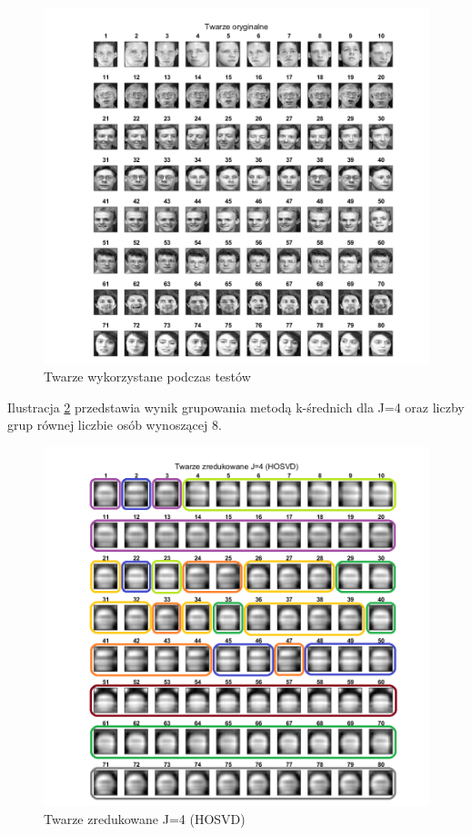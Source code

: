 \documentclass[11pt, a4paper]{article}
\begin{document}
\begin{figure}[H]
	\centering
	\includegraphics[width=1\textwidth]{./assets/twarze_org.png}
	\caption{Twarze wykorzystane podczas testów}
	\label{fig:twarze_org}
\end{figure}

\newpage
Ilustracja \ref{fig:rezultat_HOSVD_j4} przedstawia wynik grupowania metodą k-średnich dla J=4 oraz liczby grup równej liczbie osób wynoszącej 8.

\begin{figure}[H]
	\centering
	\includegraphics[width=1\textwidth]{./assets/rezultat_HOSVD_j4.png}
	\caption{Twarze zredukowane J=4 (HOSVD)}
	\label{fig:rezultat_HOSVD_j4}
\end{figure}
\end{document}
